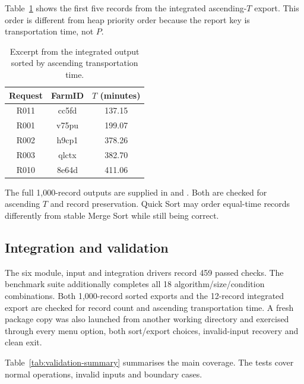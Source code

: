 \documentclass[10pt,a4paper]{article}
\begin{document}
Table~\ref{tab:sorted-excerpt} shows the first five records from the integrated ascending-$T$ export. This order is different from heap priority order because the report key is transportation time, not $P$.

\begin{table}[!htbp]
\centering
\small
\caption{Excerpt from the integrated output sorted by ascending transportation time.}
\label{tab:sorted-excerpt}
\begin{tabular}{|c|c|c|}
\hline
\textbf{Request} & \textbf{FarmID} & \textbf{$T$ (minutes)} \\
\hline
R011 & cc5fd & 137.15 \\
\hline
R001 & v75pu & 199.07 \\
\hline
R002 & h9cp1 & 378.26 \\
\hline
R003 & qlctx & 382.70 \\
\hline
R010 & 8e64d & 411.06 \\
\hline
\end{tabular}
\end{table}

The full 1,000-record outputs are supplied in  and . Both are checked for ascending $T$ and record preservation. Quick Sort may order equal-time records differently from stable Merge Sort while still being correct.

\subsection{Integration and validation}
\label{sec:integration}

The six module, input and integration drivers record 459 passed checks. The benchmark suite additionally completes all 18 algorithm/size/condition combinations. Both 1,000-record sorted exports and the 12-record integrated export are checked for record count and ascending transportation time. A fresh package copy was also launched from another working directory and exercised through every menu option, both sort/export choices, invalid-input recovery and clean exit.

Table~\ref{tab:validation-summary} summarises the main coverage. The tests cover normal operations, invalid inputs and boundary cases.
\end{document}
